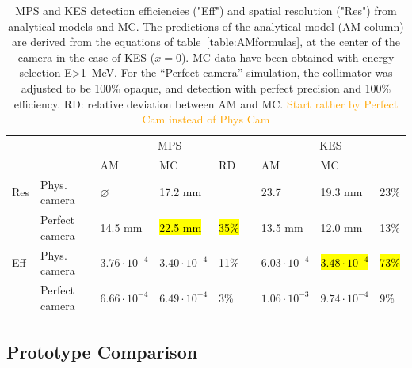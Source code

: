 \documentclass[a4paper,english,12pt]{article}
\newcommand{\ds}[2][orange]{\textcolor{#1}{#2}}
\begin{document}
\begin{table}[h]
\centering
\begin{tabular}{lllllllll}
	\midrule
	\multicolumn{2}{c}{}				& \multicolumn{3}{c}{MPS}																	&& \multicolumn{3}{c}{KES}										\\
	\cline{3-5}\cline{7-9}
	\multicolumn{2}{c}{}				& AM 										& MC 									& RD	 			&& AM 										& MC								\\
	\midrule
	Res	& Phys. camera					& $\varnothing$					& 17.2 mm 	 					&						&& 23.7									& 19.3 mm									& 23\% \\
			& Perfect camera				& 14.5 mm								& \hl{22.5 mm} 	 			& \hl{35\%}	&& 13.5 mm								& 12.0 mm									& 13\%  \\
	\midrule
	Eff & Phys. camera				&  $3.76 \cdot 10^{-4}$	& $3.40\cdot10^{-4}$	&	11\%					&& $6.03 \cdot 10^{-4}$	& \hl{$3.48\cdot10^{-4}$}	& \hl{73\%}\\
	    & Perfect camera			&  $6.66 \cdot 10^{-4}$ & $6.49\cdot10^{-4}$	&	3\%					&& $1.06 \cdot 10^{-3}$  & $9.74\cdot10^{-4}$			& 9\%\\
 	\midrule
\end{tabular}
\caption{MPS and KES detection efficiencies ("Eff") and spatial resolution ("Res") from analytical models and MC. The predictions of the analytical model (AM column) are derived from the equations of table~\ref{table:AMformulas}, at the center of the camera in the case of KES ($x=0$). MC data have been obtained with energy selection E>1~MeV. For the \enquote{Perfect camera} simulation, the collimator was adjusted to be 100\% opaque, and detection with perfect precision and 100\% efficiency. RD: relative deviation between AM and MC. \ds{Start rather by Perfect Cam instead of  Phys Cam}}
\label{tab:AMV}
\end{table}



\subsection{Prototype Comparison}
\end{document}
